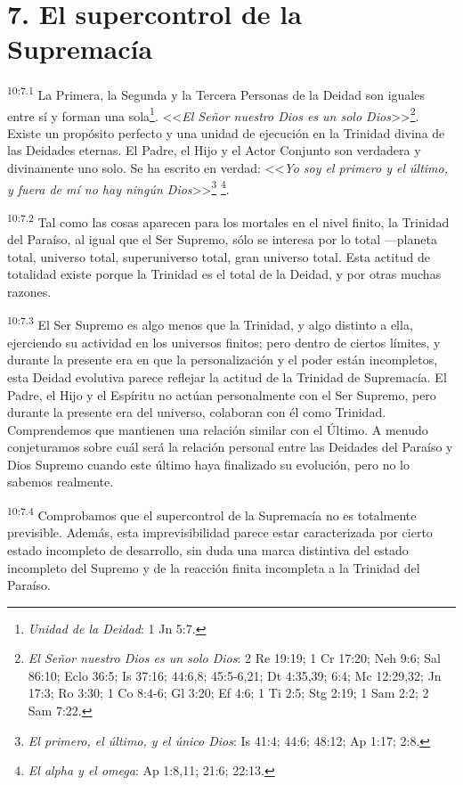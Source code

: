 \section*{7. El supercontrol de la Supremacía}
\par
\textsuperscript{10:7.1} La Primera, la Segunda y la Tercera Personas de la Deidad son iguales entre sí y forman una sola\footnote{\textit{Unidad de la Deidad}: 1 Jn 5:7.}. <<\textit{El Señor nuestro Dios es un solo Dios}>>\footnote{\textit{El Señor nuestro Dios es un solo Dios}: 2 Re 19:19; 1 Cr 17:20; Neh 9:6; Sal 86:10; Eclo 36:5; Is 37:16; 44:6,8; 45:5-6,21; Dt 4:35,39; 6:4; Mc 12:29,32; Jn 17:3; Ro 3:30; 1 Co 8:4-6; Gl 3:20; Ef 4:6; 1 Ti 2:5; Stg 2:19; 1 Sam 2:2; 2 Sam 7:22.}. Existe un propósito perfecto y una unidad de ejecución en la Trinidad divina de las Deidades eternas. El Padre, el Hijo y el Actor Conjunto son verdadera y divinamente uno solo. Se ha escrito en verdad: <<\textit{Yo soy el primero y el último, y fuera de mí no hay ningún Dios}>>\footnote{\textit{El primero, el último, y el único Dios}: Is 41:4; 44:6; 48:12; Ap 1:17; 2:8.} \footnote{\textit{El alpha y el omega}: Ap 1:8,11; 21:6; 22:13.}.

\par
\textsuperscript{10:7.2} Tal como las cosas aparecen para los mortales en el nivel finito, la Trinidad del Paraíso, al igual que el Ser Supremo, sólo se interesa por lo total ---planeta total, universo total, superuniverso total, gran universo total. Esta actitud de totalidad existe porque la Trinidad es el total de la Deidad, y por otras muchas razones.

\par
\textsuperscript{10:7.3} El Ser Supremo es algo menos que la Trinidad, y algo distinto a ella, ejerciendo su actividad en los universos finitos; pero dentro de ciertos límites, y durante la presente era en que la personalización y el poder están incompletos, esta Deidad evolutiva parece reflejar la actitud de la Trinidad de Supremacía. El Padre, el Hijo y el Espíritu no actúan personalmente con el Ser Supremo, pero durante la presente era del universo, colaboran con él como Trinidad. Comprendemos que mantienen una relación similar con el Último. A menudo conjeturamos sobre cuál será la relación personal entre las Deidades del Paraíso y Dios Supremo cuando este último haya finalizado su evolución, pero no lo sabemos realmente.

\par
\textsuperscript{10:7.4} Comprobamos que el supercontrol de la Supremacía no es totalmente previsible. Además, esta imprevisibilidad parece estar caracterizada por cierto estado incompleto de desarrollo, sin duda una marca distintiva del estado incompleto del Supremo y de la reacción finita incompleta a la Trinidad del Paraíso.

